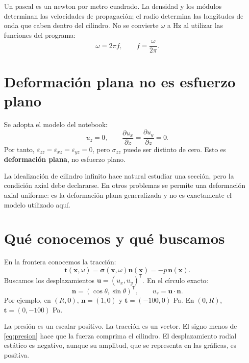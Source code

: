 \documentclass[11pt,a4paper]{report}
\numberwithin{equation}{chapter}
\newcommand{\vect}[1]{\bm{#1}}
\begin{document}
Un pascal es un newton por metro cuadrado. La densidad y los m\'odulos
determinan las velocidades de propagaci\'on; el radio determina las
longitudes de onda que caben dentro del cilindro. No se convierte
$\omega$ a Hz al utilizar las funciones del programa:
\begin{equation}
  \omega=2\pi f,\qquad f=\frac{\omega}{2\pi}.
\end{equation}

\section{Deformaci\'on plana no es esfuerzo plano}
Se adopta el modelo del notebook:
\begin{equation}
  u_z=0,\qquad
  \frac{\partial u_x}{\partial z}=
  \frac{\partial u_y}{\partial z}=0.
\end{equation}
Por tanto, $\varepsilon_{zz}=\varepsilon_{xz}=\varepsilon_{yz}=0$,
pero $\sigma_{zz}$ puede ser distinto de cero. Esto es
\textbf{deformaci\'on plana}, no esfuerzo plano.

La idealizaci\'on de cilindro infinito hace natural estudiar una secci\'on,
pero la condici\'on axial debe declararse. En otros problemas se permite
una deformaci\'on axial uniforme: es la deformaci\'on plana generalizada y
no es exactamente el modelo utilizado aqu\'i.

\section{Qu\'e conocemos y qu\'e buscamos}
En la frontera conocemos la tracci\'on:
\begin{equation}
  \vect t(\vect x,\omega)=\vect\sigma(\vect x,\omega)\vect n(\vect x)
  =-p\,\vect n(\vect x).
  \label{eq:presion}
\end{equation}
Buscamos los desplazamientos $\vect u=(u_x,u_y)^{\mathsf T}$.
En el c\'irculo exacto:
\begin{equation}
  \vect n=(\cos\theta,\sin\theta)^{\mathsf T},\qquad
  u_r=\vect u\cdot\vect n.
\end{equation}
Por ejemplo, en $(R,0)$, $\vect n=(1,0)$ y
$\vect t=(-100,0)$ Pa. En $(0,R)$, $\vect t=(0,-100)$ Pa.

\begin{idea}
La presi\'on es un escalar positivo. La tracci\'on es un vector.
El signo menos de \eqref{eq:presion} hace que la fuerza comprima el
cilindro. El desplazamiento radial est\'atico es negativo, aunque su
amplitud, que se representa en las gr\'aficas, es positiva.
\end{idea}
\end{document}
